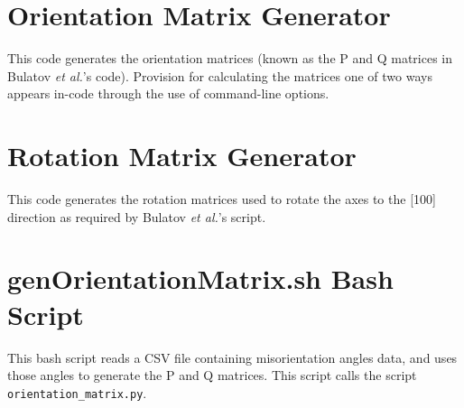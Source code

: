 \documentclass[12pt]{report}
\begin{document}
\chapter{Orientation Matrix Generator\label{app:OrientationMatrix}}
This code generates the orientation matrices (known as the P and Q matrices in Bulatov \emph{et al.}'s code). Provision for calculating the matrices one of two ways appears in-code through the use of command-line options.



\chapter{Rotation Matrix Generator\label{app:RotationMatrix}}
This code generates the rotation matrices used to rotate the axes to the [100] direction as required by Bulatov \emph{et al.}'s script.



\chapter{genOrientationMatrix.sh Bash Script\label{app:genOrientationMatrix}}
This bash script reads a CSV file containing misorientation angles data, and uses those angles to generate the P and Q matrices.  This script calls the script \lstinline!orientation_matrix.py!.


\end{document}
